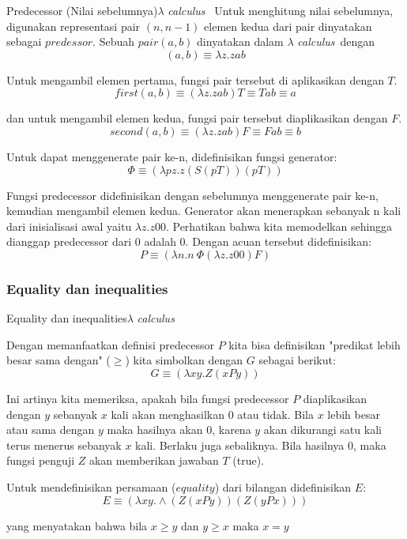 \documentclass[aspectratio=1610,10pt,handout]{beamer}
\newcommand{\lc}{$\lambda$ {\it calculus}\ }
\begin{document}
\begin{frame}{Predecessor (Nilai sebelumnya)}{\lc}
	Untuk menghitung nilai sebelumnya, digunakan representasi pair $(n, n-1)$ elemen kedua dari pair dinyatakan sebagai $predessor$.  Sebuah $pair(a,b)$ dinyatakan dalam \lc dengan
	$$ (a,b) \equiv \lambda z. z a b$$

	Untuk mengambil elemen pertama, fungsi pair tersebut di aplikasikan dengan $T$.
	$$ first (a,b) \equiv (\lambda z. z a b) T \equiv Tab \equiv a $$

	dan untuk mengambil elemen kedua, fungsi pair tersebut diaplikasikan dengan $F$.
	$$ second (a,b) \equiv (\lambda z. z a b) F \equiv Fab \equiv b $$

	Untuk dapat menggenerate pair ke-n, didefinisikan fungsi generator: $$\Phi \equiv (\lambda pz. z(S(pT))(pT)) $$

	Fungsi predecessor didefinisikan dengan sebelumnya menggenerate pair ke-n, kemudian mengambil elemen kedua. Generator akan menerapkan sebanyak n kali dari inisialisasi awal yaitu  $\lambda z.z00$. Perhatikan bahwa kita memodelkan sehingga dianggap predecessor dari 0 adalah 0. Dengan acuan tersebut didefinisikan:
	$$ P \equiv (\lambda n. n\ \Phi (\lambda z.z00)F )$$

\end{frame}

\subsubsection{Equality dan inequalities}
\begin{frame}{Equality dan inequalities}{\lc}

Dengan memanfaatkan definisi predecessor $P$ kita bisa definisikan "predikat lebih besar sama dengan" ($\geq $)  kita simbolkan dengan $G$ sebagai berikut:
$$ G \equiv (\lambda xy.Z(xPy))$$

Ini artinya kita memeriksa, apakah bila fungsi predecessor $P$ diaplikasikan dengan $y$ sebanyak $x$ kali akan menghasilkan $0$ atau tidak. Bila $x$ lebih besar atau sama dengan $y$ maka hasilnya akan 0, karena $y$ akan dikurangi satu kali terus menerus sebanyak $x$ kali. Berlaku juga sebaliknya.
Bila hasilnya 0, maka fungsi penguji $Z$ akan memberikan jawaban $T$ (true).

Untuk mendefinisikan persamaan ($equality$) dari bilangan didefinisikan $E$:
$$ E \equiv (\lambda xy. \wedge (Z(xPy))(Z(yPx))) $$

yang menyatakan bahwa bila $x\geq y$ dan $y \geq x$ maka $x=y$

\end{frame}
\end{document}
